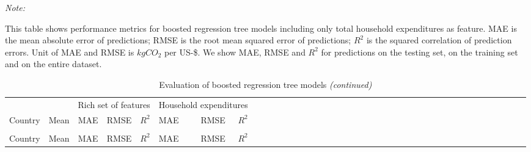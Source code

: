\begingroup\fontsize{8}{10}\selectfont

\begin{ThreePartTable}
\begin{TableNotes}
\item \textit{Note: } 
\item This table shows performance metrics for boosted regression tree models including only total household expenditures as feature. MAE is the mean absolute error of predictions; RMSE is the root mean squared error of predictions; $R^{2}$ is the squared correlation of prediction errors. Unit of MAE and RMSE is $kgCO_{2}$ per US-\$. We show MAE, RMSE and $R^{2}$ for predictions on the testing set, on the training set and on the entire dataset. 
\end{TableNotes}
\begin{longtable}[t]{l|r|rrrl|r|rrrl|r|rrrl|r|rrrl|r|rrrl|r|rrrl|r|rrrl|r|rrr}
\caption{\label{tab:A8}Evaluation of boosted regression tree models}\\
\toprule
\multicolumn{2}{c}{ } & \multicolumn{3}{c}{Rich set of features} & \multicolumn{3}{c}{Household expenditures} \\
\cmidrule(l{3pt}r{3pt}){3-5} \cmidrule(l{3pt}r{3pt}){6-8}
Country & Mean & MAE & RMSE & $R^{2}$ & MAE & RMSE & $R^{2}$\\
\midrule
\endfirsthead
\caption[]{Evaluation of boosted regression tree models \textit{(continued)}}\\
\toprule
Country & Mean & MAE & RMSE & $R^{2}$ & MAE & RMSE & $R^{2}$\\
\midrule
\endhead


\end{longtable}
\end{ThreePartTable}
